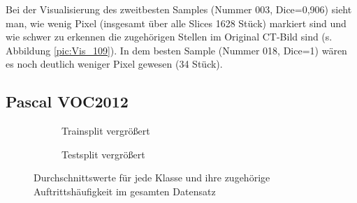 Bei der Visualisierung des zweitbesten Samples (Nummer 003, Dice=0,906) sieht man, wie wenig Pixel (insgesamt über alle Slices 1628 Stück) markiert sind und wie schwer zu erkennen die zugehörigen Stellen im Original CT-Bild sind (s. Abbildung \ref{pic:Vis_109}). In dem besten Sample (Nummer 018, Dice=1) wären es noch deutlich weniger Pixel gewesen (34 Stück).

\subsection{Pascal VOC2012}
\begin{figure}[H]

%


\begin{subfigure}{\textwidth}

\caption{Trainsplit vergrößert}
\label{pic:Haeuf-Train_204-zoom}
\end{subfigure}



%


\begin{subfigure}{\textwidth}

\caption{Testsplit vergrößert}
\label{pic:Haeuf-Test_204-zoom}
\end{subfigure}
\caption{Durchschnittswerte für jede Klasse und ihre zugehörige Auftrittshäufigkeit im gesamten Datensatz}
\label{pic:Haeuf_204}
\end{figure}

